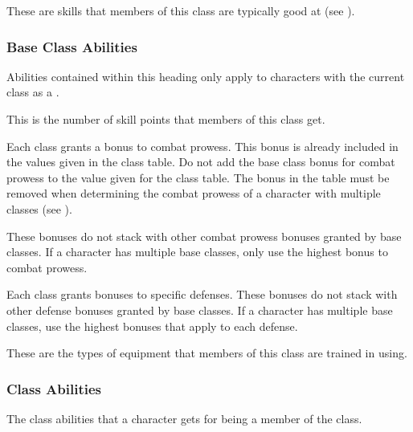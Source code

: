         These are skills that members of this class are typically good at (see ).

        \subsubsection{Base Class Abilities}
            Abilities contained within this heading only apply to characters with the current class as a .

            This is the number of skill points that members of this class get.

            Each class grants a bonus to combat prowess.
            This bonus is already included in the values given in the class table.
            Do not add the base class bonus for combat prowess to the value given for the class table.
            The bonus in the table must be removed when determining the combat prowess of a character with multiple classes (see ).

            These bonuses do not stack with other combat prowess bonuses granted by base classes.
            If a character has multiple base classes, only use the highest bonus to combat prowess.

            Each class grants bonuses to specific defenses.
            These bonuses do not stack with other defense bonuses granted by base classes.
            If a character has multiple base classes, use the highest bonuses that apply to each defense.

            These are the types of equipment that members of this class are trained in using.

        \subsubsection{Class Abilities}
            The class abilities that a character gets for being a member of the class.

